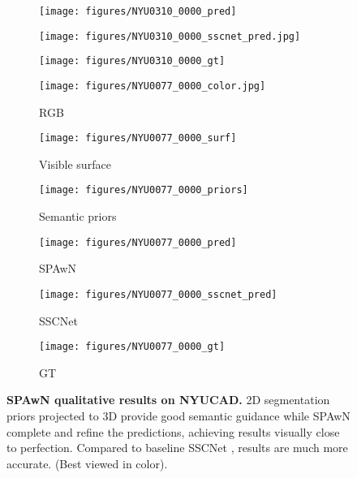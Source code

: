 \begin{figure*}[ht!]
\begin{subfigure}{0.160\textwidth}
\end{subfigure}
\begin{subfigure}{0.160\textwidth}
\texttt{[image: figures/NYU0310\_0000\_pred]}

\end{subfigure}
\begin{subfigure}{0.160\textwidth}
\texttt{[image: figures/NYU0310\_0000\_sscnet\_pred.jpg]}

\end{subfigure}
\begin{subfigure}{0.160\textwidth}
\texttt{[image: figures/NYU0310\_0000\_gt]}

\end{subfigure}
\begin{subfigure}{0.160\textwidth}
\texttt{[image: figures/NYU0077\_0000\_color.jpg]}
\caption{RGB}
\label{fig:rgb}

\end{subfigure}
\begin{subfigure}{0.160\textwidth}
\texttt{[image: figures/NYU0077\_0000\_surf]}
\caption{Visible surface}
\label{fig:surf}

\end{subfigure}
\begin{subfigure}{0.160\textwidth}
\texttt{[image: figures/NYU0077\_0000\_priors]}
\caption{Semantic priors}
\label{fig:priors}

\end{subfigure}
\begin{subfigure}{0.160\textwidth}
\texttt{[image: figures/NYU0077\_0000\_pred]}
\caption{SPAwN}
\label{fig:pred}

\end{subfigure}
\begin{subfigure}{0.160\textwidth}
\texttt{[image: figures/NYU0077\_0000\_sscnet\_pred]}
\caption{SSCNet}
\label{fig:pred2}


\end{subfigure}
\begin{subfigure}{0.160\textwidth}
\texttt{[image: figures/NYU0077\_0000\_gt]}
\caption{GT}
\label{fig:gt}

\end{subfigure}
\caption{\textbf{ SPAwN qualitative results on NYUCAD.} 2D segmentation priors projected to 3D provide good semantic guidance
while SPAwN complete and refine the predictions, achieving results visually close to perfection. Compared to baseline SSCNet \cite{song_semantic_2017}, results are much more accurate. (Best viewed in color).}
\label{fig:qualy}
\end{figure*}
 

